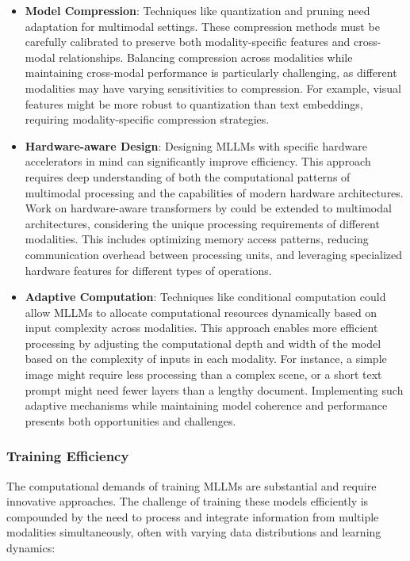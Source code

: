 \begin{itemize}
    \item \textbf{Model Compression}: Techniques like quantization and pruning \citep{ganesh2021compressing} need adaptation for multimodal settings. These compression methods must be carefully calibrated to preserve both modality-specific features and cross-modal relationships. Balancing compression across modalities while maintaining cross-modal performance is particularly challenging, as different modalities may have varying sensitivities to compression. For example, visual features might be more robust to quantization than text embeddings, requiring modality-specific compression strategies.
    
    \item \textbf{Hardware-aware Design}: Designing MLLMs with specific hardware accelerators in mind can significantly improve efficiency. This approach requires deep understanding of both the computational patterns of multimodal processing and the capabilities of modern hardware architectures. Work on hardware-aware transformers by \citet{wang2021spatten} could be extended to multimodal architectures, considering the unique processing requirements of different modalities. This includes optimizing memory access patterns, reducing communication overhead between processing units, and leveraging specialized hardware features for different types of operations.
    
    \item \textbf{Adaptive Computation}: Techniques like conditional computation \citep{bengio2013estimating} could allow MLLMs to allocate computational resources dynamically based on input complexity across modalities. This approach enables more efficient processing by adjusting the computational depth and width of the model based on the complexity of inputs in each modality. For instance, a simple image might require less processing than a complex scene, or a short text prompt might need fewer layers than a lengthy document. Implementing such adaptive mechanisms while maintaining model coherence and performance presents both opportunities and challenges.
\end{itemize}

\subsubsection{Training Efficiency}
The computational demands of training MLLMs are substantial and require innovative approaches. The challenge of training these models efficiently is compounded by the need to process and integrate information from multiple modalities simultaneously, often with varying data distributions and learning dynamics:


